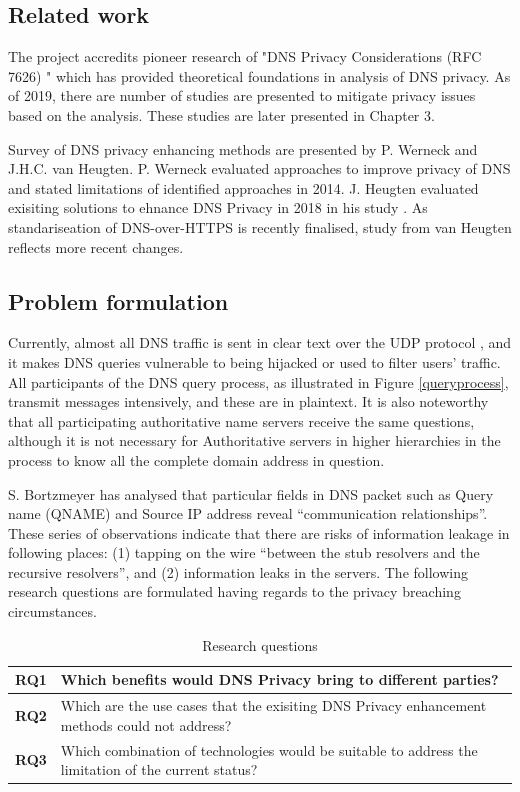 \documentclass[a4paper,12pt]{article}
\begin{document}
\subsection{Related work}
The project accredits pioneer research of "DNS Privacy Considerations (RFC 7626) \cite{rfc7626}" which has provided theoretical foundations in analysis of DNS privacy. 
As of 2019, there are number of studies are presented to mitigate privacy issues based on the analysis. These studies are later presented in Chapter 3.

Survey of DNS privacy enhancing methods are presented by P. Werneck and J.H.C. van Heugten. P. Werneck evaluated approaches to improve privacy of DNS and stated limitations of identified approaches\cite{werneck2014dns} in 2014. J. Heugten evaluated exisiting solutions to ehnance DNS Privacy in 2018 in his study \cite{van2018privacy}. As standariseation of DNS-over-HTTPS is recently finalised\cite{rfc8484}, study from van Heugten reflects more recent changes.

\subsection{Problem formulation}\label{problemformulation}
Currently, almost all DNS traffic is sent in clear text \cite{rfc7626} over the UDP protocol \cite{tcp2014analysis}, and it makes DNS queries vulnerable to being hijacked or used to filter users' traffic.
All participants of the DNS query process, as illustrated in Figure \ref{queryprocess}, transmit messages intensively, and these are in plaintext.
It is also noteworthy that all participating authoritative name servers receive the same questions, although it is not necessary for Authoritative servers in higher hierarchies in the process to know all the complete domain address in question.

S. Bortzmeyer has analysed that particular fields in DNS packet\cite{rfc1035} such as Query name (QNAME) and Source IP address reveal ``communication relationships\cite{rfc7626}''.
These series of observations indicate that there are risks of information leakage in following places: (1) tapping on the wire ``between the stub resolvers and the recursive resolvers'', and (2) information leaks in the servers.
The following research questions are formulated having regards to the privacy breaching circumstances.

\begin{table}[h!]
    \begin{tabular} {|p{1.2cm}|p{12.8cm}|} \hline
        \textbf{RQ1} & Which benefits would DNS Privacy bring to different parties? \\ \hline
        \textbf{RQ2} & Which are the use cases that the exisiting DNS Privacy enhancement methods could not address? \\ \hline
        \textbf{RQ3} & Which combination of technologies would be suitable to address the limitation of the current status?\\ \hline
    \end{tabular}
    \caption{Research questions}
\label{researchquestions}
\end{table}
\end{document}
